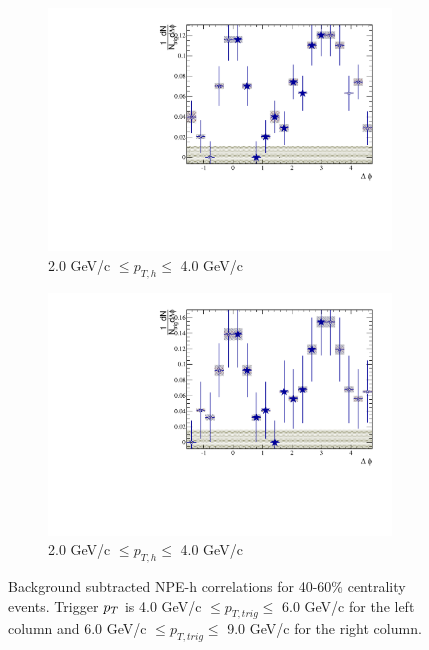 \begin{figure}[htbp]
\begin{subfigure}{0.5\textwidth}
		\includegraphics[width=\textwidth]{Plots/Correlations/subtracted/NPE_eh_corr_subtracted_primpt_4_5_cent_2_3_assopt_3_4.pdf}
		\caption{2.0 GeV/c $\leq p_{T,h} \leq$ 4.0 GeV/c}
		\label{fig:Sub4060e}
	\end{subfigure}	
	\begin{subfigure}{0.5\textwidth}
		\includegraphics[width=\textwidth]{Plots/Correlations/subtracted/NPE_eh_corr_subtracted_primpt_6_8_cent_2_3_assopt_3_4.pdf}
		\caption{2.0 GeV/c $\leq p_{T,h} \leq$ 4.0 GeV/c}
		\label{fig:Sub4060f}
	\end{subfigure}	
\caption[Subtracted Correlations 40-60\% Centrality]{Background subtracted NPE-h correlations for 40-60\% centrality events. Trigger $p_{T}$ is 4.0 GeV/c $\leq p_{T,trig} \leq$ 6.0 GeV/c for the left column and 6.0 GeV/c $\leq p_{T,trig} \leq$ 9.0 GeV/c for the right column.}
\label{fig:Sub4060}
\end{figure}

